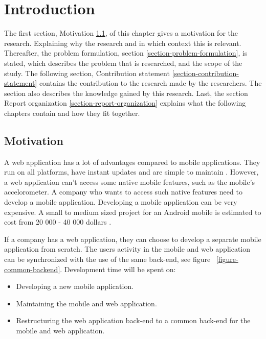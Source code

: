 \chapter{Introduction}\label{chapter-introduction}
The first section, Motivation \ref{section-motivation}, of this chapter gives a motivation for the research. Explaining why the research and in which context this is relevant. Thereafter, the problem formulation, section \ref{section-problem-formulation}, is stated, which describes the problem that is researched, and the scope of the study. The following section, Contribution statement \ref{section-contribution-statement} contains the contribution to the research made by the researchers. The section also describes the knowledge gained by this research. Last, the section Report organization \ref{section-report-organization} explains what the following chapters contain and how they fit together.

\section{Motivation}\label{section-motivation}
A web application has a lot of advantages compared to mobile applications. They run on all platforms, have instant updates and are simple to maintain \cite{michaels2013}. However, a web application can't access some native mobile features, such as the mobile's accelorometer. A company who wants to access such native features need to develop a mobile application. Developing a mobile application can be very expensive. A small to medium sized project for an Android mobile is estimated to cost from 20 000 - 40 000 dollars \cite{kohan2015}.

If a company has a web application, they can choose to develop a separate mobile application from scratch. The users activity in the mobile and web application can be synchronized with the use of the same back-end, see figure ~\ref{figure-common-backend}. Development time will be spent on: 
\begin{itemize}
\item Developing a new mobile application.
\item Maintaining the mobile and web application.
\item Restructuring the web application back-end to a common back-end for the mobile and web application.
\end{itemize}

